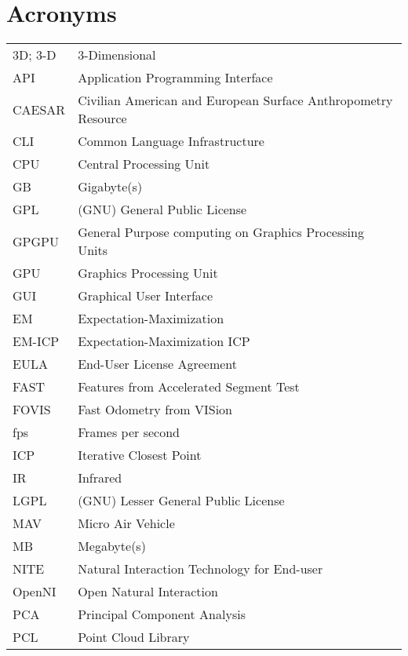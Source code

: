 \cleardoublepage
{}
{}
\chapter*{Acronyms}


\noindent
\begin{longtable}{@{}p{}p{}@{}}
    3D; 3-D & 3-Dimensional \\
        API & Application Programming Interface \\
     CAESAR & Civilian American and European Surface Anthropometry Resource \\
        CLI & Common Language Infrastructure \\
        CPU & Central Processing Unit \\
         GB & Gigabyte(s) \\
        GPL & (GNU) General Public License \\
      GPGPU & General Purpose computing on Graphics Processing Units \\
        GPU & Graphics Processing Unit \\
        GUI & Graphical User Interface \\
         EM & Expectation-Maximization \\
     EM-ICP & Expectation-Maximization ICP \\
       EULA & End-User License Agreement \\
       FAST & Features from Accelerated Segment Test \\
      FOVIS & Fast Odometry from VISion \\
        fps & Frames per second \\
        ICP & Iterative Closest Point \\
         IR & Infrared \\
       LGPL & (GNU) Lesser General Public License \\
        MAV & Micro Air Vehicle \\
         MB & Megabyte(s) \\
       NITE & Natural Interaction Technology for End-user \\
     OpenNI & Open Natural Interaction \\
        PCA & Principal Component Analysis \\
        PCL & Point Cloud Library \\

\end{longtable}
